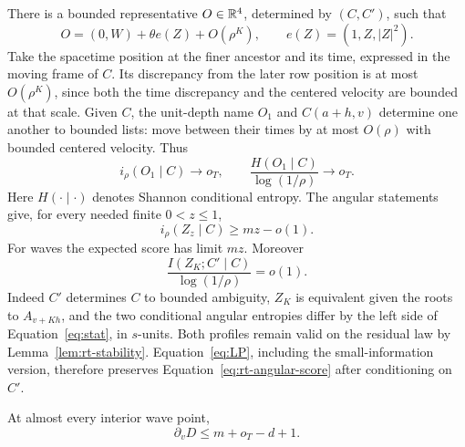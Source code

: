 There is a bounded representative $O\in\mathbb R^4$, determined by
$(C,C')$, such that
\begin{equation}\label{eq:rt-incidence-point}
 O=(0,W)+\theta e(Z)+O(\rho^K),\qquad
 e(Z)=(1,Z,|Z|^2).
\end{equation}
Take the spacetime position at the finer ancestor and its time,
expressed in the moving frame of $C$.  Its discrepancy from the
later row position is at most $O(\rho^K)$, since both the time
discrepancy and the centered velocity are bounded at that scale.
Given $C$, the unit-depth name $O_1$ and $C(a+h,v)$ determine
one another to bounded lists: move between their times by at most
$O(\rho)$ with bounded centered velocity.  Thus
\begin{equation}\label{eq:rt-point-score}
 i_\rho(O_1\mid C)\longrightarrow o_T,
 \qquad
 \frac{H(O_1\mid C)}{\log(1/\rho)}\longrightarrow o_T.
\end{equation}
Here $H(\cdot\mid\cdot)$ denotes Shannon conditional entropy.
The angular statements give, for every needed finite $0<z\le1$,
\begin{equation}\label{eq:rt-angular-score}
 i_\rho(Z_z\mid C)\ge mz-o(1).
\end{equation}
For waves the expected score has limit $mz$.  Moreover
\begin{equation}\label{eq:rt-stationary-information}
 \frac{I(Z_K;C'\mid C)}{\log(1/\rho)}=o(1).
\end{equation}
Indeed $C'$ determines $C$ to bounded ambiguity, $Z_K$ is
equivalent given the roots to $A_{v+Kh}$, and the two conditional
angular entropies differ by the left side of
Equation~\eqref{eq:stat}, in $s$-units.  Both profiles remain
valid on the residual law by Lemma~\ref{lem:rt-stability}.
Equation~\eqref{eq:LP}, including the small-information version,
therefore preserves Equation~\eqref{eq:rt-angular-score} after
conditioning on $C'$.

\begin{lemma}\label{lem:rt-width-derivative}
At almost every interior wave point,
\begin{equation}
 \partial_vD\le m+o_T-d+1.
 \tag{rv}\label{eq:rv}
\end{equation}
\end{lemma}

